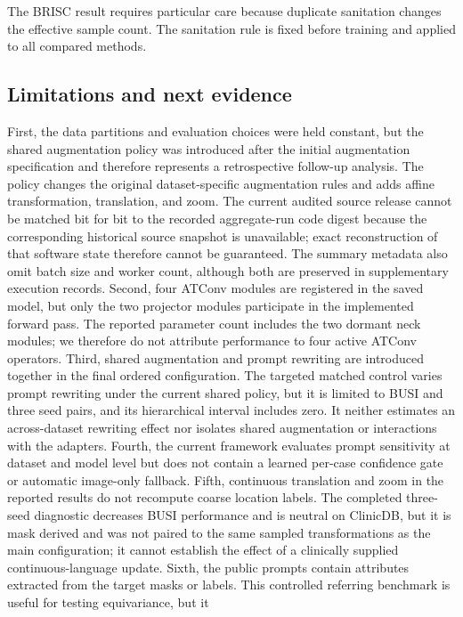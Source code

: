 The BRISC result requires particular care because duplicate sanitation changes
the effective sample count. The sanitation rule is fixed before training and
applied to all compared methods.

\subsection{Limitations and next evidence}
First, the data partitions and evaluation choices were held constant, but the
shared augmentation policy was introduced after the initial augmentation
specification and therefore represents a retrospective follow-up analysis. The
policy changes the original dataset-specific augmentation rules and adds affine
transformation, translation, and zoom. The current audited source release cannot
be matched bit for bit to the recorded aggregate-run code digest because the
corresponding historical source snapshot is unavailable; exact reconstruction of
that software state therefore cannot be guaranteed. The summary metadata also
omit batch size and worker count, although both are preserved in supplementary
execution records. Second, four ATConv modules are registered in the saved model,
but only the two projector modules participate in the implemented forward pass. The reported
parameter count includes the two dormant neck modules; we therefore do not
attribute performance to four active ATConv operators. Third, shared augmentation
and prompt rewriting are introduced together in the final ordered configuration.
The targeted matched control varies prompt rewriting under the current shared
policy, but it is limited to BUSI and three seed pairs, and its hierarchical
interval includes zero. It neither estimates an across-dataset rewriting effect
nor isolates shared augmentation or interactions with the adapters. Fourth, the
current framework evaluates prompt sensitivity at dataset and model level but does
not contain a learned per-case confidence gate or automatic image-only fallback.
Fifth, continuous translation and zoom in the reported \methodname{} results do not recompute coarse
location labels. The completed three-seed \locrecompute{} diagnostic decreases
BUSI performance and is neutral on ClinicDB, but it is mask derived and was not
paired to the same sampled transformations as the main configuration; it cannot
establish the effect of a clinically supplied continuous-language update. Sixth,
the public prompts contain attributes extracted from the target masks or labels.
This controlled referring benchmark is useful for testing equivariance, but it
